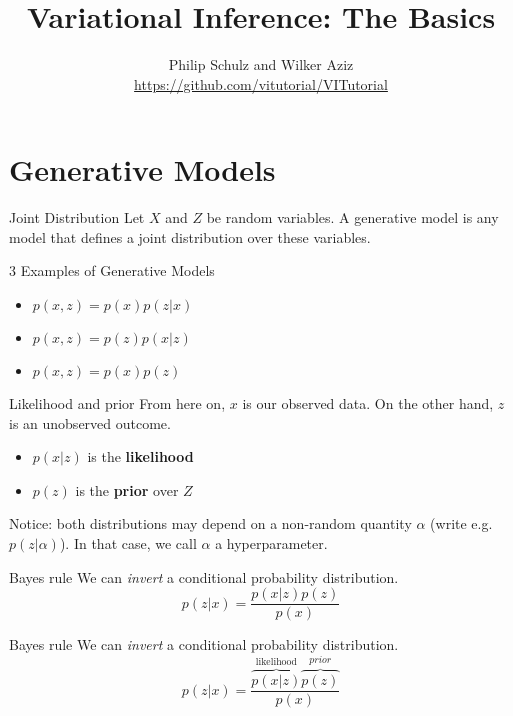 \documentclass[14pt, aspectratio=169]{beamer}
\title{Variational Inference: The Basics}
\date{}
\author[Schulz and Aziz]{Philip Schulz and Wilker Aziz \\
\url{https://github.com/vitutorial/VITutorial}}
\begin{document}
\frame{\titlepage}

\frame{\tableofcontents}

\section{Generative Models}
\frame{\tableofcontents[currentsection]}

\begin{frame}{Joint Distribution}
Let $ X $ and $ Z $ be random variables. A generative model is any model that defines a joint distribution
over these variables. 
\pause
\begin{block}{3 Examples of Generative Models}
\begin{itemize}
\item $ p(x,z) = p(x) p(z|x) $
\item $ p(x,z) = p(z) p(x|z) $
\item $ p(x,z) = p(x) p(z) $
\end{itemize}
\end{block}
\end{frame}

\begin{frame}{Likelihood and prior}
From here on, $ x $ is our observed data. On the other hand, $ z $ is an unobserved outcome. 
\begin{itemize}
\item $ p(x|z) $ is the \textbf{likelihood}
\item $ p(z) $ is the \textbf{prior} over $ Z $
\end{itemize} 
Notice: both distributions may depend on a non-random quantity $ \alpha $ (write e.g. $ p(z|\alpha) $). In that case, we 
call $ \alpha $ a hyperparameter.
\end{frame}

\begin{frame}{Bayes rule}
We can \textit{invert} a conditional probability distribution.
\begin{equation*}
p(z|x) = \frac{p(x|z)p(z)}{p(x)}
\end{equation*}
\end{frame}

\begin{frame}{Bayes rule}
We can \textit{invert} a conditional probability distribution.
\begin{equation*}
p(z|x) = \frac{\overbrace{p(x|z)}^{\text{likelihood}}\overbrace{p(z)}^{prior}}{p(x)}
\end{equation*}
\end{frame}
\end{document}

